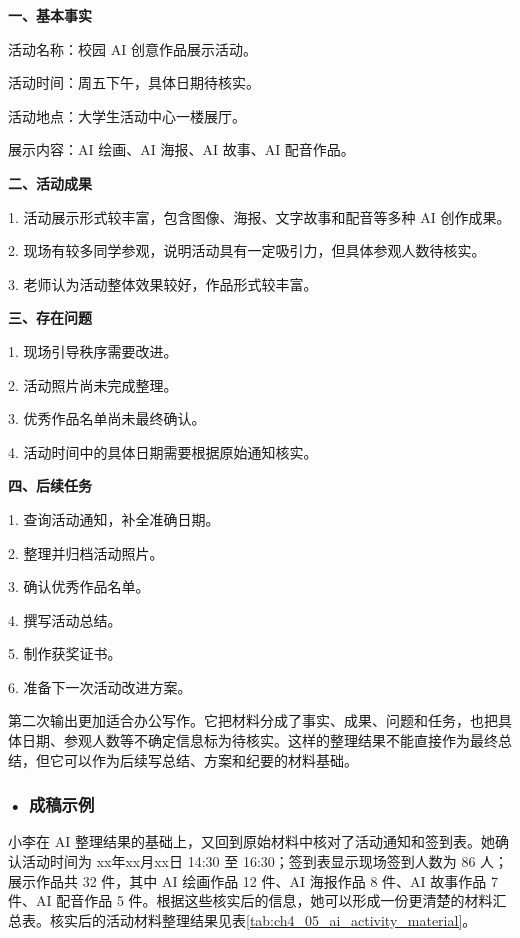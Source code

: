 \begin{aibox}
\textbf{一、基本事实}

活动名称：校园 AI 创意作品展示活动。

活动时间：周五下午，具体日期待核实。

活动地点：大学生活动中心一楼展厅。

展示内容：AI 绘画、AI 海报、AI 故事、AI 配音作品。

\textbf{二、活动成果}

1. 活动展示形式较丰富，包含图像、海报、文字故事和配音等多种 AI 创作成果。

2. 现场有较多同学参观，说明活动具有一定吸引力，但具体参观人数待核实。

3. 老师认为活动整体效果较好，作品形式较丰富。

\textbf{三、存在问题}

1. 现场引导秩序需要改进。

2. 活动照片尚未完成整理。

3. 优秀作品名单尚未最终确认。

4. 活动时间中的具体日期需要根据原始通知核实。

\textbf{四、后续任务}

1. 查询活动通知，补全准确日期。

2. 整理并归档活动照片。

3. 确认优秀作品名单。

4. 撰写活动总结。

5. 制作获奖证书。

6. 准备下一次活动改进方案。
\end{aibox}

第二次输出更加适合办公写作。它把材料分成了事实、成果、问题和任务，也把具体日期、参观人数等不确定信息标为待核实。这样的整理结果不能直接作为最终总结，但它可以作为后续写总结、方案和纪要的材料基础。

\subsubsection*{\textbf{• 成稿示例}}

小李在 AI 整理结果的基础上，又回到原始材料中核对了活动通知和签到表。她确认活动时间为 xx年xx月xx日 14:30 至 16:30；签到表显示现场签到人数为 86 人；展示作品共 32 件，其中 AI 绘画作品 12 件、AI 海报作品 8 件、AI 故事作品 7 件、AI 配音作品 5 件。根据这些核实后的信息，她可以形成一份更清楚的材料汇总表。核实后的活动材料整理结果见表\ref{tab:ch4_05_ai_activity_material}。

